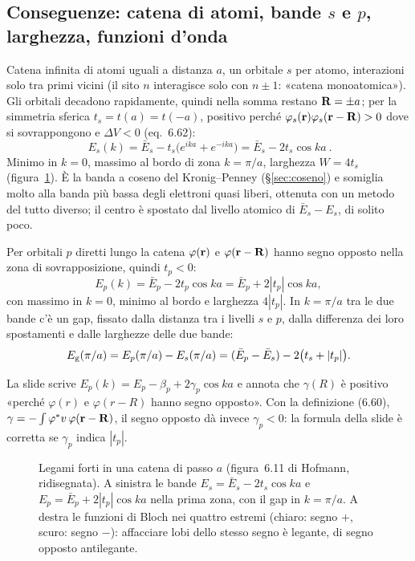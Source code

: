 \documentclass[11pt,a4paper]{article}
\begin{document}
\subsection{Conseguenze: catena di atomi, bande $s$ e $p$, larghezza, funzioni d'onda}\label{sec:tbconseg}
Catena infinita di atomi uguali a distanza $a$, un orbitale $s$ per atomo, interazioni solo tra primi vicini (il sito $n$ interagisce solo con $n\pm1$:
«catena monoatomica»). Gli orbitali decadono rapidamente, quindi nella somma restano $\mathbf R=\pm a$; per la simmetria sferica $t_s=t(a)=t(-a)$, positivo
perché $\varphi_s(\mathbf r)\varphi_s(\mathbf r-\mathbf R)>0$ dove si sovrappongono e $\Delta V<0$ (eq.~6.62):
\[
\boxed{\ E_s(k)=\bar E_s-t_s\bigl(e^{ika}+e^{-ika}\bigr)=\bar E_s-2t_s\cos ka\ }.
\]
Minimo in $k=0$, massimo al bordo di zona $k=\pi/a$, larghezza $W=4t_s$ (figura~\ref{fig:tb}). È la banda a coseno del Kronig--Penney
(§\ref{sec:coseno}) e somiglia molto alla banda più bassa degli elettroni quasi liberi, ottenuta con un metodo del tutto diverso; il centro è spostato dal
livello atomico di $\bar E_s-E_s$, di solito poco.

Per orbitali $p$ diretti lungo la catena $\varphi(\mathbf r)$ e $\varphi(\mathbf r-\mathbf R)$ hanno segno opposto nella zona di sovrapposizione, quindi $t_p<0$:
\[
E_p(k)=\bar E_p-2t_p\cos ka=\bar E_p+2|t_p|\cos ka ,
\]
con massimo in $k=0$, minimo al bordo e larghezza $4|t_p|$. In $k=\pi/a$ tra le due bande c'è un gap, fissato dalla distanza tra i livelli $s$ e $p$,
dalla differenza dei loro spostamenti e dalle larghezze delle due bande:
\[
E_{\mathrm g}(\pi/a)=E_p(\pi/a)-E_s(\pi/a)=(\bar E_p-\bar E_s)-2\bigl(t_s+|t_p|\bigr).
\]
\begin{osservazione}
La slide scrive $E_p(k)=E_p-\beta_p+2\gamma_p\cos ka$ e annota che $\gamma(R)$ è positivo «perché $\varphi(r)$ e $\varphi(r-R)$ hanno segno opposto».
Con la definizione (6.60), $\gamma=-\int\varphi^*v\,\varphi(\mathbf r-\mathbf R)$, il segno opposto dà invece $\gamma_p<0$: la formula della slide è corretta se
$\gamma_p$ indica $|t_p|$.
\end{osservazione}

\begin{figure}[tbp]
\centering
{}
\caption{Legami forti in una catena di passo $a$ (figura~6.11 di Hofmann, ridisegnata). A sinistra le bande $E_s=\bar E_s-2t_s\cos ka$ e
$E_p=\bar E_p+2|t_p|\cos ka$ nella prima zona, con il gap in $k=\pi/a$. A destra le funzioni di Bloch nei quattro estremi (chiaro: segno $+$, scuro:
segno $-$): affacciare lobi dello stesso segno è legante, di segno opposto antilegante.}\label{fig:tb}
\end{figure}
\end{document}
